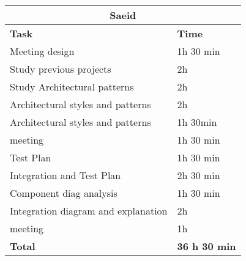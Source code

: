 \begin{table}[H]
\begin{tabular}{|l|l|}
\hline
\multicolumn{2}{|c|}{\textbf{Saeid}}            \\ \hline
\textbf{Task}                   & \textbf{Time} \\ \hline
Meeting design & 1h 30 min \\ \hline
Study previous projects & 2h \\ \hline
Study Architectural  patterns & 2h \\ \hline
Architectural styles and patterns & 2h \\ \hline
Architectural styles and patterns & 1h 30min \\ \hline
meeting & 1h  30 min \\ \hline
Test Plan & 1h  30 min \\ \hline
Integration and Test Plan & 2h  30 min \\ \hline
Component diag analysis & 1h  30 min \\ \hline
Integration diagram and explanation & 2h \\ \hline
meeting & 1h \\ \hline
\rowcolor {polilight}
\textbf{Total}                  & \textbf{36 h 30 min}   \\ \hline
\end{tabular}
\end{table}
